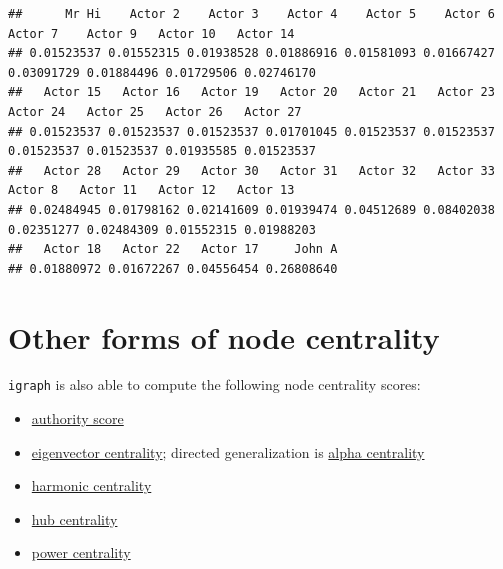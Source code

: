 \documentclass[
]{book}
\newenvironment{Shaded}{\begin{snugshade}}{\end{snugshade}}
\newcommand{\AttributeTok}[1]{\textcolor[rgb]{0.13,0.29,0.53}{#1}}
\newcommand{\CommentTok}[1]{\textcolor[rgb]{0.56,0.35,0.01}{\textit{#1}}}
\newcommand{\FunctionTok}[1]{\textcolor[rgb]{0.13,0.29,0.53}{\textbf{#1}}}
\newcommand{\NormalTok}[1]{#1}
\newcommand{\SpecialCharTok}[1]{\textcolor[rgb]{0.81,0.36,0.00}{\textbf{#1}}}
\providecommand{\tightlist}{%
  \setlength{\itemsep}{0pt}\setlength{\parskip}{0pt}}
\begin{document}
\begin{Shaded}
\end{Shaded}

\begin{verbatim}
##      Mr Hi    Actor 2    Actor 3    Actor 4    Actor 5    Actor 6    Actor 7    Actor 9   Actor 10   Actor 14 
## 0.01523537 0.01552315 0.01938528 0.01886916 0.01581093 0.01667427 0.03091729 0.01884496 0.01729506 0.02746170 
##   Actor 15   Actor 16   Actor 19   Actor 20   Actor 21   Actor 23   Actor 24   Actor 25   Actor 26   Actor 27 
## 0.01523537 0.01523537 0.01523537 0.01701045 0.01523537 0.01523537 0.01523537 0.01523537 0.01935585 0.01523537 
##   Actor 28   Actor 29   Actor 30   Actor 31   Actor 32   Actor 33    Actor 8   Actor 11   Actor 12   Actor 13 
## 0.02484945 0.01798162 0.02141609 0.01939474 0.04512689 0.08402038 0.02351277 0.02484309 0.01552315 0.01988203 
##   Actor 18   Actor 22   Actor 17     John A 
## 0.01880972 0.01672267 0.04556454 0.26808640
\end{verbatim}

\begin{Shaded}
\end{Shaded}

\section{Other forms of node centrality}\label{other-forms-of-node-centrality}

\texttt{igraph} is also able to compute the following node centrality scores:

\begin{itemize}
\tightlist
\item
  \href{https://igraph.org/r/doc/authority_score.html}{authority score}
\item
  \href{https://igraph.org/r/doc/eigen_centrality.html}{eigenvector centrality}; directed generalization is \href{https://igraph.org/r/doc/alpha_centrality.html}{alpha centrality}
\item
  \href{https://igraph.org/r/doc/harmonic_centrality.html}{harmonic centrality}
\item
  \href{https://igraph.org/r/doc/hub_score.html}{hub centrality}
\item
  \href{https://igraph.org/r/doc/power_centrality.html}{power centrality}
\end{itemize}
\end{document}
